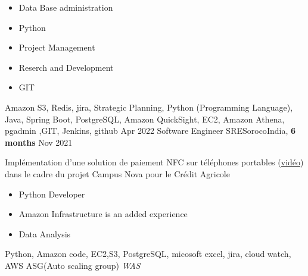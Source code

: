 \begin{experiences}
{\begin{itemize}
                        \item Data Base administration           
                        \item Python     
                        \item Project Management   
                        \item Reserch and Development   
                        \item GIT   
                      \end{itemize}
                    }
                    {
                      Amazon S3, Redis, jira, Strategic Planning, Python (Programming Language), Java, Spring Boot, PostgreSQL, Amazon QuickSight, EC2, Amazon Athena, pgadmin
                      ,GIT, Jenkins, github
                    }
  \emptySeparator
  \experience
  {Apr 2022}  {Software Engineer SRE}{Soroco}{India, \textbf{6 months}}  
  {Nov 2021}   {
                      Implémentation d'une solution de paiement NFC sur téléphones portables (\href{http://www.nouvo.ch/s-007}{vidéo}) 
                      dans le cadre du projet Campus Nova pour le Crédit Agricole  
                      \begin{itemize}
                        \item Python Developer                                          
                        \item Amazon Infrastructure is an added experience  
                        \item Data Analysis  
                      \end{itemize}
                  }
                  {Python, Amazon code, EC2,S3, PostgreSQL, micosoft excel, jira, cloud watch, AWS ASG(Auto scaling group) \emph{WAS}}  
\end{experiences}

